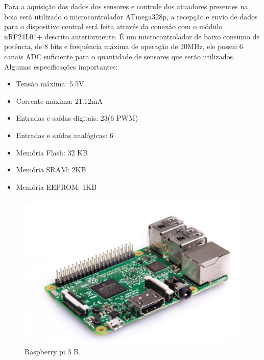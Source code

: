 Para a aquisição dos dados dos sensores e controle dos atuadores presentes na boia será utilizado o microcontrolador ATmega328p, a recepção e envio de dados para o dispositivo central será feita através da conexão com o módulo nRF24L01+ descrito anteriormente. É um microcontrolador de baixo consumo de potência, de 8 bits e frequência máxima de operação de 20MHz, ele possui 6 canais ADC suficiente para o quantidade de sensores que serão utilizados. Algumas especificações importantes:

\begin{itemize}
\item Tensão máxima: 5.5V
\item Corrente máxima: 21.12mA
\item Entradas e saídas digitais: 23(6 PWM)
\item Entradas e saídas analógicas: 6
\item Memória Flash: 32 KB
\item Memória SRAM: 2KB
\item Memória EEPROM: 1KB
\end{itemize}


\begin{figure}[H]
 \centering
   \includegraphics[keepaspectratio=true,scale=0.8]{figuras/raspberry.eps}
 \caption{Raspberry pi 3 B.}
 \label{Raspberry}
\end{figure}

